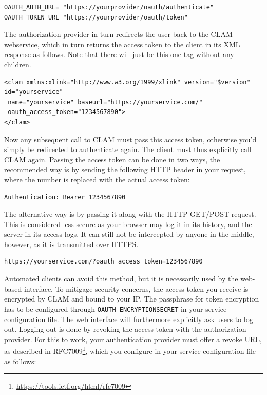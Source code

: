 \documentclass[a4paper,12pt,twoside,openright]{report}
\begin{document}
{ \small
\begin{verbatim}
OAUTH_AUTH_URL= "https://yourprovider/oauth/authenticate"
OAUTH_TOKEN_URL "https://yourprovider/oauth/token"
\end{verbatim}
}

The authorization provider in turn redirects the user back to the CLAM
webservice, which in turn returns the access token to the client in its XML
response as follows. Note that there will just be this one tag without any
children.

{ \small
\begin{verbatim}
<clam xmlns:xlink="http://www.w3.org/1999/xlink" version="$version"
id="yourservice"
 name="yourservice" baseurl="https://yourservice.com/"
 oauth_access_token="1234567890">
</clam>
\end{verbatim}
}

Now any subsequent call to CLAM must pass this access token, otherwise you'd
simply be redirected to authenticate again. The client must thus explicitly call CLAM
again. Passing the access token can be done in two ways, the recommended way is
by sending the following HTTP header in your request, where the number is
replaced with the actual access token:

{ \small
\begin{verbatim}
Authentication: Bearer 1234567890
\end{verbatim}
}

The alternative way is by passing it along with the HTTP GET/POST request. This
is considered less secure as your browser may log it in its history, and the
server in its access logs. It can still not be intercepted by anyone in the
middle, however, as it is transmitted over HTTPS.

{ \small
\begin{verbatim}
https://yourservice.com/?oauth_access_token=1234567890
\end{verbatim}
}

Automated clients can avoid this method, but it is necessarily used by the
web-based interface. To mitigage security concerns, the access token you
receive is encrypted by CLAM and bound to your IP. The passphrase for token
encryption has to be configured through \texttt{OAUTH\_ENCRYPTIONSECRET} in
your service configuration file. The web interface will furthermore explicitly
ask users to log out. Logging out is done by revoking the access token with the
authorization provider. For this to work, your authentication provider must
offer a revoke URL, as described in RFC7009\footnote{
\url{https://tools.ietf.org/html/rfc7009}}, which you configure in your service
configuration file as follows:
\end{document}
